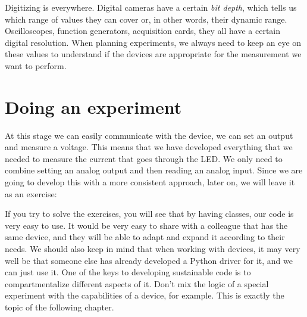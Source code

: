 Digitizing is everywhere. Digital cameras have a certain \emph{bit depth}, which tells us which range of values they can cover or, in other words, their dynamic range. Oscilloscopes, function generators, acquisition cards, they all have a certain digital resolution. When planning experiments, we always need to keep an eye on these values to understand if the devices are appropriate for the measurement we want to perform.


\section{Doing an experiment}
At this stage we can easily communicate with the device, we can set an output and measure a voltage. This means that we have developed everything that we needed to measure the current that goes through the LED. We only need to combine setting an analog output and then reading an analog input. Since we are going to develop this with a more consistent approach, later on, we will leave it as an exercise:




If you try to solve the exercises, you will see that by having classes, our code is very easy to use. It would be very easy to share with a colleague that has the same device, and they will be able to adapt and expand it according to their needs. We should also keep in mind that when working with devices, it may very well be that someone else has already developed a Python driver for it, and we can just use it. One of the keys to developing sustainable code is to compartmentalize different aspects of it. Don't mix the logic of a special experiment with the capabilities of a device, for example. This is exactly the topic of the following chapter.

